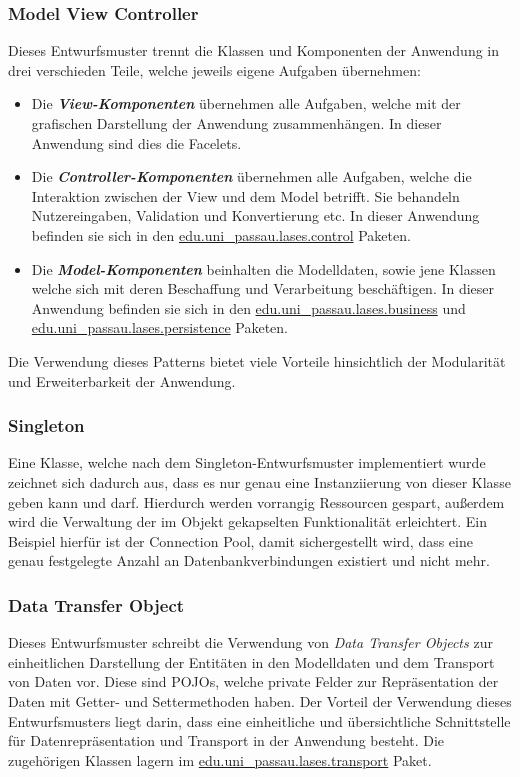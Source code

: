 \subsubsection{Model View Controller}\label{arch:mvc}
Dieses Entwurfsmuster trennt die Klassen und Komponenten der Anwendung in drei
verschieden Teile, welche jeweils eigene Aufgaben übernehmen:
\begin{itemize}
    \item Die \emph{\textbf{View-Komponenten}} übernehmen alle Aufgaben,
    welche mit der grafischen Darstellung der Anwendung zusammenhängen.
    In dieser Anwendung sind dies die Facelets. %
    \item Die \emph{\textbf{Controller-Komponenten}} übernehmen alle Aufgaben,
    welche die Interaktion zwischen der View und dem Model betrifft. Sie behandeln
    Nutzereingaben, Validation und Konvertierung etc. In dieser Anwendung befinden sie
    sich in den \hyperref[arch:control]{edu.uni\_passau.lases.control} Paketen.
    \item Die \emph{\textbf{Model-Komponenten}} beinhalten die Modelldaten, sowie jene
    Klassen welche sich mit deren Beschaffung und Verarbeitung beschäftigen. In dieser
    Anwendung befinden sie sich in den \hyperref[arch:business]{edu.uni\_passau.lases.business}
    und \hyperref[arch:persistence]{edu.uni\_passau.lases.persistence} Paketen.
\end{itemize}
Die Verwendung dieses Patterns bietet viele Vorteile hinsichtlich der Modularität
und Erweiterbarkeit der Anwendung.

\subsubsection{Singleton}
Eine Klasse, welche nach dem Singleton-Entwurfsmuster implementiert wurde zeichnet
sich dadurch aus, dass es nur genau eine Instanziierung von dieser Klasse geben
kann und darf. Hierdurch werden vorrangig Ressourcen gespart, außerdem wird die
Verwaltung der im Objekt gekapselten Funktionalität erleichtert.
Ein Beispiel hierfür ist der Connection Pool, damit sichergestellt wird, dass
eine genau festgelegte Anzahl an Datenbankverbindungen existiert und nicht mehr.

\subsubsection{Data Transfer Object}
Dieses Entwurfsmuster schreibt die Verwendung von \emph{Data Transfer Objects}
zur einheitlichen Darstellung der Entitäten in den Modelldaten und dem Transport
von Daten vor.
Diese sind POJOs, welche private Felder zur Repräsentation der Daten mit Getter- und
Settermethoden haben.
Der Vorteil der Verwendung dieses Entwurfsmusters liegt darin, dass eine
einheitliche und übersichtliche Schnittstelle für Datenrepräsentation und Transport
in der Anwendung besteht. Die zugehörigen Klassen lagern im
\hyperref[arch:transport]{edu.uni\_passau.lases.transport} Paket.

